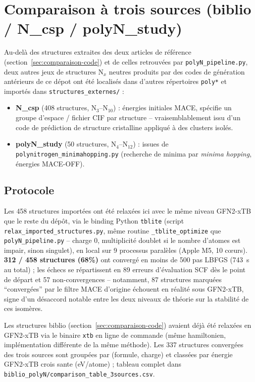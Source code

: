 \documentclass[11pt,a4paper]{article}
\begin{document}
\section{Comparaison \`a trois sources (biblio / N\_csp / polyN\_study)}
\label{sec:comparaison-3sources}

Au-del\`a des structures extraites des deux articles de r\'ef\'erence
(section~\ref{sec:comparaison-code}) et de celles retrouv\'ees par
\texttt{polyN\_pipeline.py}, deux autres jeux de structures N$_x$ neutres
produits par des codes de g\'en\'eration ant\'erieurs de ce d\'epot ont
\'et\'e localis\'es dans d'autres r\'epertoires \texttt{poly*} et import\'es
dans \texttt{structures\_externes/} :

\begin{itemize}
  \item \textbf{N\_csp} (408 structures, N$_3$--N$_{10}$) : \'energies
  initiales MACE, sp\'ecifie un groupe d'espace / fichier CIF par structure
  -- vraisemblablement issu d'un code de pr\'ediction de structure
  cristalline appliqu\'e \`a des clusters isol\'es.
  \item \textbf{polyN\_study} (50 structures, N$_4$--N$_{12}$) : issues de
  \texttt{polynitrogen\_minimahopping.py} (recherche de minima par
  \emph{minima hopping}, \'energies MACE-OFF).
\end{itemize}

\subsection{Protocole}

Les 458 structures import\'ees ont \'et\'e relax\'ees ici avec le m\^eme
niveau GFN2-xTB que le reste du d\'ep\^ot, via le binding Python
\texttt{tblite} (script \texttt{relax\_imported\_structures.py}, m\^eme
routine \texttt{\_tblite\_optimize} que \texttt{polyN\_pipeline.py} --
charge 0, multiplicit\'e doublet si le nombre d'atomes est impair, sinon
singulet), en local sur 9 processus paral\`eles (Apple M5, 10 c\oe urs).
\textbf{312 / 458 structures (68\%)} ont converg\'e en moins de 500 pas
LBFGS (743~s au total) ; les \'echecs se r\'epartissent en 89 erreurs
d'\'evaluation SCF d\`es le point de d\'epart et 57 non-convergences --
notamment, 87 structures marqu\'ees ``converg\'ees'' par le filtre MACE
d'origine \'echouent en r\'ealit\'e sous GFN2-xTB, signe d'un d\'esaccord
notable entre les deux niveaux de th\'eorie sur la stabilit\'e de ces
isom\`eres.

Les structures biblio (section~\ref{sec:comparaison-code}) avaient d\'ej\`a
\'et\'e relax\'ees en GFN2-xTB via le binaire \texttt{xtb} en ligne de
commande (m\^eme hamiltonien, impl\'ementation diff\'erente de la m\^eme
m\'ethode). Les 337 structures converg\'ees des trois sources sont
group\'ees par (formule, charge) et class\'ees par \'energie GFN2-xTB
crois sante (eV/atome) ; tableau complet dans
\texttt{biblio\_polyN/comparison\_table\_3sources.csv}.
\end{document}
